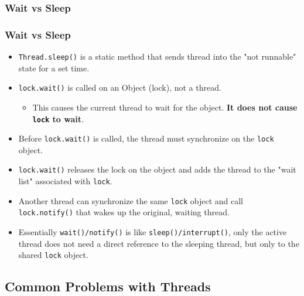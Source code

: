 \documentclass{beamer}
\begin{document}
\subsubsection{Wait vs Sleep}
\begin{frame}
\frametitle{Wait vs Sleep}
\begin{itemize}
\item \texttt{Thread.sleep()} is a static method that sends {\color{orange}thread} into the "not runnable" state for a set time.
\item \texttt{lock.wait()} is called on an {\color{green} Object} (lock), {\color{red}not} a {\color{orange}thread}.
\begin{itemize}
\item This causes the current {\color{orange}thread} to wait for the {\color{green}object}. \textbf{It does not cause \texttt{lock} to wait}.
\end{itemize}
\item Before \texttt{lock.wait()} is called, the thread must {\color{blue}synchronize} on the \texttt{lock} object.
\item \texttt{lock.wait()} releases the lock on the object and adds the {\color{orange} thread} to the "wait list" associated with \texttt{lock}.

\item Another {\color{orange} thread} can {\color{blue} synchronize} the same \texttt{lock} object and call \texttt{lock.notify()} that wakes up the original, waiting {\color{orange} thread}.

\item Essentially \texttt{wait()/notify()} is like \texttt{sleep()/interrupt()}, only the active {\color{orange} thread} does not need a direct reference to the sleeping thread, but only to the shared \texttt{lock} object.
\end{itemize} 
\end{frame}

\subsection{Common Problems with Threads}
\end{document}

